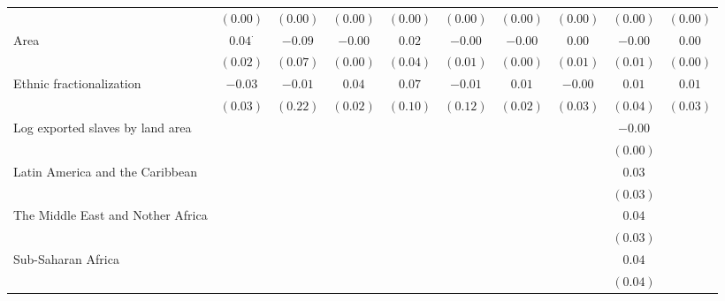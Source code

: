 \begin{sidewaystable}
\begin{center}
{\begin{tabular}{l c c c c c c c c c}
                                  & $(0.00)$       & $(0.00)$       & $(0.00)$ & $(0.00)$ & $(0.00)$ & $(0.00)$ & $(0.00)$       & $(0.00)$       & $(0.00)$     \\
Area                              & $0.04^{\cdot}$ & $-0.09$        & $-0.00$  & $0.02$   & $-0.00$  & $-0.00$  & $0.00$         & $-0.00$        & $0.00$       \\
                                  & $(0.02)$       & $(0.07)$       & $(0.00)$ & $(0.04)$ & $(0.01)$ & $(0.00)$ & $(0.01)$       & $(0.01)$       & $(0.00)$     \\
Ethnic fractionalization          & $-0.03$        & $-0.01$        & $0.04$   & $0.07$   & $-0.01$  & $0.01$   & $-0.00$        & $0.01$         & $0.01$       \\
                                  & $(0.03)$       & $(0.22)$       & $(0.02)$ & $(0.10)$ & $(0.12)$ & $(0.02)$ & $(0.03)$       & $(0.04)$       & $(0.03)$     \\
Log exported slaves by land area  &                &                &          &          &          &          &                & $-0.00$        &              \\
                                  &                &                &          &          &          &          &                & $(0.00)$       &              \\
Latin America and the Caribbean   &                &                &          &          &          &          &                & $0.03$         &              \\
                                  &                &                &          &          &          &          &                & $(0.03)$       &              \\
The Middle East and Nother Africa &                &                &          &          &          &          &                & $0.04$         &              \\
                                  &                &                &          &          &          &          &                & $(0.03)$       &              \\
Sub-Saharan Africa                &                &                &          &          &          &          &                & $0.04$         &              \\
                                  &                &                &          &          &          &          &                & $(0.04)$       &              \\

\end{tabular}}
\end{center}
\end{sidewaystable}

